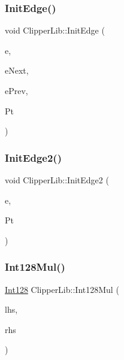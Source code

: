 \subsubsection{\texorpdfstring{InitEdge()}{InitEdge()}}
{\footnotesize\ttfamily void Clipper\+Lib\+::\+Init\+Edge (\begin{DoxyParamCaption}\item[{\mbox{\hyperlink{struct_clipper_lib_1_1_t_edge}{T\+Edge}} $\ast$}]{e,  }\item[{\mbox{\hyperlink{struct_clipper_lib_1_1_t_edge}{T\+Edge}} $\ast$}]{e\+Next,  }\item[{\mbox{\hyperlink{struct_clipper_lib_1_1_t_edge}{T\+Edge}} $\ast$}]{e\+Prev,  }\item[{const \mbox{\hyperlink{struct_clipper_lib_1_1_int_point}{Int\+Point}} \&}]{Pt }\end{DoxyParamCaption})\hspace{0.3cm}{\ttfamily [inline]}}

\mbox{\label{namespace_clipper_lib_ae5ad4a2545fa1528f81bd2a89d9cddcb}} 
\subsubsection{\texorpdfstring{InitEdge2()}{InitEdge2()}}
{\footnotesize\ttfamily void Clipper\+Lib\+::\+Init\+Edge2 (\begin{DoxyParamCaption}\item[{\mbox{\hyperlink{struct_clipper_lib_1_1_t_edge}{T\+Edge}} \&}]{e,  }\item[{\mbox{\hyperlink{namespace_clipper_lib_a50d662440e5e100070014ed91281e960}{Poly\+Type}}}]{Pt }\end{DoxyParamCaption})}

\mbox{\label{namespace_clipper_lib_a54fd38efeb2ae1bb84d1390bff3cf6bc}} 
\subsubsection{\texorpdfstring{Int128Mul()}{Int128Mul()}}
{\footnotesize\ttfamily \mbox{\hyperlink{class_clipper_lib_1_1_int128}{Int128}} Clipper\+Lib\+::\+Int128\+Mul (\begin{DoxyParamCaption}\item[{\mbox{\hyperlink{namespace_clipper_lib_a7fd564bf34d174b6c96e07d01e5e7a0a}{long64}}}]{lhs,  }\item[{\mbox{\hyperlink{namespace_clipper_lib_a7fd564bf34d174b6c96e07d01e5e7a0a}{long64}}}]{rhs }\end{DoxyParamCaption})}

